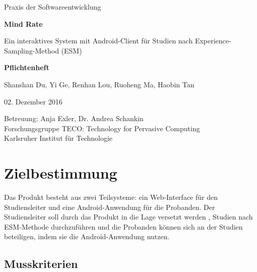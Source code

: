 \documentclass[a4paper]{scrreprt}
\begin{document}
    \begin{center} \large

        Praxis der Softwareentwicklung
        \vspace * {1.5cm}

        \textbf{\huge Mind Rate}

        \vspace*{1cm}


        {\Large Ein interaktives System mit Android-Client f\"ur Studien nach Experience-Sampling-Method (ESM)}

        \vspace*{1cm}

        \textbf{\Large Pflichtenheft}
        \vspace*{2cm}

        Shanshan Du, Yi Ge, Renhan Lou, Ruoheng Ma, Haobin Tan
        \vspace*{1cm}

        02. Dezember 2016
        \vspace*{2.5cm}

        Betreuung: Anja Exler, Dr. Andrea Schankin\\[0.5cm]
        Forschungsgruppe TECO: Technology for Pervasive Computing\\[0.5cm]

        Karlsruher Institut für Technologie
    \end{center}
    \thispagestyle{empty}

    \tableofcontents

    \chapter{Zielbestimmung}

        \noindent Das Produkt besteht aus zwei Teilsysteme: ein \gls{Web-Interface} für den \gls{Studiensleiter} und eine Android-Anwendung für die \gls{Proband}en. Der \gls{Studiensleiter} soll durch das Produkt in die Lage versetzt werden , Studien nach ESM-Methode durchzuf\"uhren und die Probanden k\"onnen sich an der Studien beteiligen, indem sie die Android-Anwendung nutzen.


        \section{Musskriterien}
\end{document}
